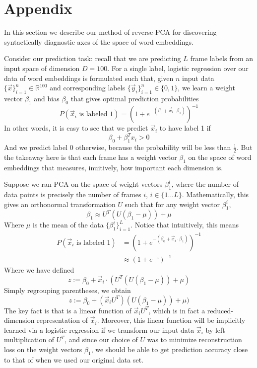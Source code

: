 \documentclass[11pt,a4paper]{article}
\begin{document}
%
%



\appendix

\section{Appendix}
\label{sec:supplemental}
In this section we describe our method of reverse-PCA for discovering syntactically diagnostic axes of the space of word embeddings.

Consider our prediction task: recall that we are predicting $L$ frame labels from an input space of dimension $D=100$. For a single label, logistic regression over our data of word embeddings is formulated such that, given $n$ input data $\{\vec x\}_{i=1}^n \in \mathbb{R}^{100}$ and corresponding labels $\{\vec y_i\}_{i=1}^n \in \{0,1\}$, we learn a weight vector $\beta_1$ and bias $\beta_0$ that gives optimal prediction probabilities
\[ P(\vec x_i \text{ is labeled } 1) = (1 + e^{-(\beta_0 + \vec x_i \cdot \beta_1)})^{-1} \]
In other words, it is easy to see that we predict $\vec x_i$ to have label 1 if 
\[  \beta_0 + \beta_1^T x_i > 0 \]
And we predict label 0 otherwise, because the probability will be less than $\frac{1}{2}$. But the takeaway here is that each frame has a weight vector $\beta_1$ on the space of word embeddings that measures, inuitively, how important each dimension is.  

Suppose we ran PCA on the space of weight vectors $\beta_1^i$, where the number of data points is precisely the number of frames $i$, $i \in \{1...L\}$. Mathematically, this gives an orthonormal transformation $U$ such that for any weight vector $\beta_1^i$, 
\[ \beta_1 \approx U^T(U(\beta_1 - \mu)) + \mu \] 
Where $\mu$ is the mean of the data $\{\beta_1^i\}_{i=1}^L$. Notice that intuitively, this means
\begin{align*} 
P(\vec x_i \text{ is labeled } 1) &= (1 + e^{-(\beta_0 + \vec x_i \cdot \beta_1)})^{-1}  \\
&\approx (1 + e^{-z})^{-1} 
\end{align*}
Where we have defined
\[ z := \beta_0 + \vec x_i \cdot (U^T(U(\beta_1 - \mu)) + \mu) \]
Simply regrouping parentheses, we obtain
\[ z := \beta_0 + (\vec x_i  U^T)(U(\beta_1 - \mu)) + \mu) \]
The key fact is that is a linear function of $\vec x_i U^T$, which is in fact a reduced-dimension representation of $\vec x_i$. Moreover, this linear function will be implicitly learned via a logistic regression if we transform our input data $\vec x_i$ by left-multiplication of $U^T$, and since our choice of $U$ was to minimize reconstruction loss on the weight vectors $\beta_1$, we should be able to get prediction accuracy close to that of when we used our original data set. 
\end{document}
